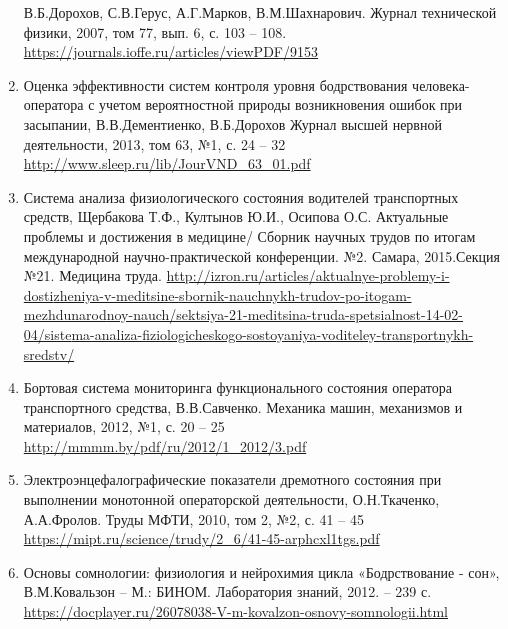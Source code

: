 \begin{enumerate}
    В.Б.Дорохов, С.В.Герус, А.Г.Марков, В.М.Шахнарович. Журнал технической физики, 2007, том 77, вып. 6, с. 103 – 108.
    \url{https://journals.ioffe.ru/articles/viewPDF/9153}
    \item Оценка эффективности систем контроля уровня бодрствования человека-оператора с учетом вероятностной природы возникновения ошибок при засыпании, В.В.Дементиенко, В.Б.Дорохов
    Журнал высшей нервной деятельности, 2013, том 63, №1, с. 24 – 32
    \url{http://www.sleep.ru/lib/JourVND_63_01.pdf}
    \item Система анализа физиологического состояния водителей транспортных \linebreak средств, Щербакова Т.Ф., Култынов Ю.И., Осипова О.С. Актуальные проблемы и достижения в медицине/ Сборник научных трудов по итогам международной научно-практической конференции. №2. Самара, 2015.Секция №21. Медицина труда.
    \url{http://izron.ru/articles/aktualnye-problemy-i-dosti}\linebreak \url{zheniya-v-meditsine-sbornik-nauchnykh-trudov-po-itogam-mezhdunarod}\linebreak \url{noy-nauch/sektsiya-21-meditsina-truda-spetsialnost-14-02-04/siste}\linebreak \url{ma-analiza-fiziologicheskogo-sostoyaniya-voditeley-transportnykh-}\linebreak \url{sredstv/}
    \item Бортовая система мониторинга функционального состояния оператора транспортного средства, В.В.Савченко. Механика машин, механизмов и материалов, 2012, №1,  с. 20 – 25
    \url{http://mmmm.by/pdf/ru/2012/1_2012/3.pdf}
    \item Электроэнцефалографические показатели дремотного состояния при выполнении монотонной операторской деятельности, О.Н.Ткаченко, А.А.Фролов. Труды МФТИ, 2010, том 2, №2, с. 41 – 45
    \url{https://mipt.ru/science/trudy/2_6/41-45-arphcxl1tgs.pdf}
    \item Основы сомнологии: физиология и нейрохимия цикла «Бодрствование - сон», В.М.Ковальзон – М.: БИНОМ. Лаборатория знаний, 2012. – 239 с.
    \url{https://docplayer.ru/26078038-V-m-kovalzon-osnovy-somnologii.html} 
\end{enumerate}